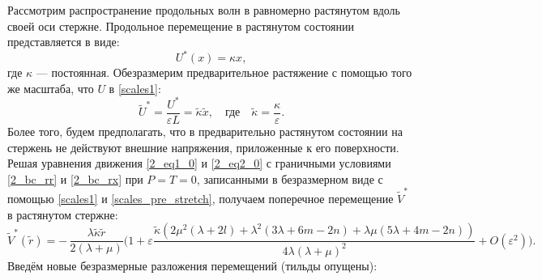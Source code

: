 \documentclass[12pt, a4paper]{report}
\begin{document}
Рассмотрим распространение продольных волн в равномерно растянутом вдоль своей оси стержне. Продольное перемещение в растянутом состоянии представляется в виде:
\begin{equation}\label{pre_stretch_u}
U^*(x) = \kappa x,
\end{equation}
где $\kappa$ --- постоянная.
Обезразмерим предварительное растяжение с помощью того же масштаба, что $U$ в \eqref{scales1}:
\begin{equation} \label{scales_pre_stretch}
\tilde U^* = \frac{U^*}{\varepsilon L} = \tilde\kappa \tilde x, \quad \mbox{где} \quad  \tilde \kappa = \frac{\kappa}{\varepsilon}.
\end{equation}
Более того, будем предполагать, что в предварительно растянутом состоянии на стержень не действуют внешние напряжения, приложенные к его поверхности. Решая уравнения движения \eqref{2_eq1_0} и \eqref{2_eq2_0} с граничными условиями \eqref{2_bc_rr} и \eqref{2_bc_rx} при $P = T = 0$, записанными в безразмерном виде с помощью \eqref{scales1} и \eqref{scales_pre_stretch}, получаем поперечное перемещение $\tilde V^*$ в растянутом стержне:
\begin{equation}\label{pre_stretch_v}
\tilde V^*(\tilde r) = -\,\frac{\lambda \tilde\kappa \tilde r}{2(\lambda+\mu)} \bigg(1 + \varepsilon \frac{\tilde\kappa \left(2\mu^2 (\lambda + 2l) + \lambda^2 (3\lambda + 6m - 2n) + \lambda\mu(5\lambda + 4m - 2n)\right)}{4\lambda(\lambda + \mu)^2} 
+ O(\varepsilon^2)\bigg).
\end{equation}
Введём новые безразмерные разложения перемещений (тильды опущены):
\end{document}
